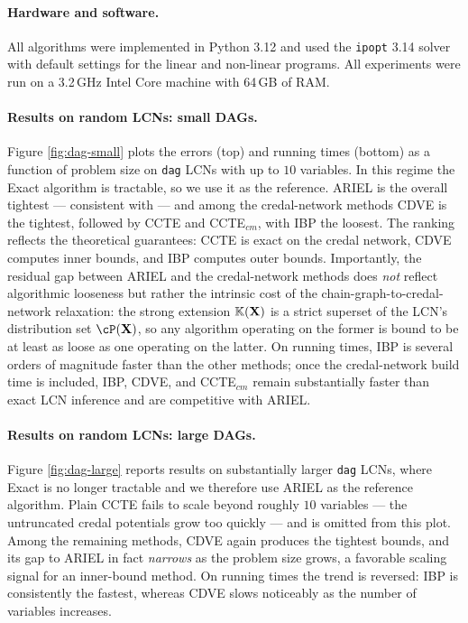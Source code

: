 \documentclass{article}
\newcommand{\kr}[1]{\mathbb{K}\!\left( #1 \right)}
\begin{document}
\paragraph{Hardware and software.} All algorithms were implemented in Python 3.12 and used the \texttt{ipopt} 3.14 solver \cite{ipopt} with default settings for the linear and non-linear programs. All experiments were run on a 3.2\,GHz Intel Core machine with 64\,GB of RAM.

\paragraph{Results on random LCNs: small DAGs.} Figure \ref{fig:dag-small} plots the errors (top) and running times (bottom) as a function of problem size on \texttt{dag} LCNs with up to $10$ variables. In this regime the Exact algorithm is tractable, so we use it as the reference. ARIEL is the overall tightest --- consistent with \cite{marinescu2023lcn} --- and among the credal-network methods CDVE is the tightest, followed by CCTE and CCTE$_{cm}$, with IBP the loosest. The ranking reflects the theoretical guarantees: CCTE is exact on the credal network, CDVE computes inner bounds, and IBP computes outer bounds. Importantly, the residual gap between ARIEL and the credal-network methods does \emph{not} reflect algorithmic looseness but rather the intrinsic cost of the chain-graph-to-credal-network relaxation: the strong extension $\kr{\bX}$ is a strict superset of the LCN's distribution set $\cP(\bX)$, so any algorithm operating on the former is bound to be at least as loose as one operating on the latter. On running times, IBP is several orders of magnitude faster than the other methods; once the credal-network build time is included, IBP, CDVE, and CCTE$_{cm}$ remain substantially faster than exact LCN inference and are competitive with ARIEL.

\paragraph{Results on random LCNs: large DAGs.} Figure \ref{fig:dag-large} reports results on substantially larger \texttt{dag} LCNs, where Exact is no longer tractable and we therefore use ARIEL as the reference algorithm. Plain CCTE fails to scale beyond roughly $10$ variables --- the untruncated credal potentials grow too quickly --- and is omitted from this plot. Among the remaining methods, CDVE again produces the tightest bounds, and its gap to ARIEL in fact \emph{narrows} as the problem size grows, a favorable scaling signal for an inner-bound method. On running times the trend is reversed: IBP is consistently the fastest, whereas CDVE slows noticeably as the number of variables increases.
\end{document}
